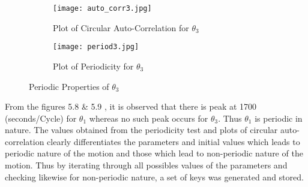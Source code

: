 \begin{figure}[H]
\begin{subfigure}{0.5\textwidth}
\texttt{[image: auto\_corr3.jpg]}
\caption{Plot of Circular Auto-Correlation for ${\theta_{3}}$}\label{fig:cir_auto3}
\end{subfigure}
\begin{subfigure}{0.5\textwidth}
\texttt{[image: period3.jpg]}
\caption{Plot of Periodicity for ${\theta_{3}}$}\label{fig:period3}
\end{subfigure}
\caption{Periodic Properties of ${\theta_{3}}$}\label{fig:image5}
\end{figure}

From the figures 5.8 \& 5.9 , it is observed that there is peak at 1700 (seconds/Cycle) for $\theta_{1}$ whereas no such peak occurs for $\theta_{3}$. Thus $\theta_{1}$ is periodic in nature. The values obtained from the periodicity test and plots of circular auto-correlation clearly differentiates the parameters and initial values which leads to periodic nature of the motion and those which lead to non-periodic nature of the motion. Thus by iterating through all possibles values of the parameters and checking likewise for non-periodic nature, a set of keys was generated and stored. 


